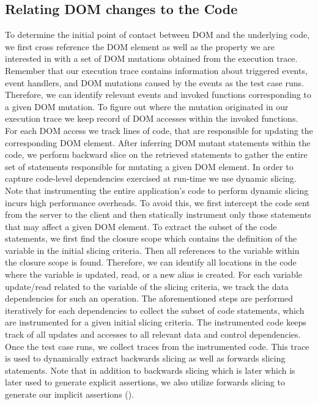 \subsection{Relating DOM changes to the \javascript Code} \label{Sec:domToCode}
To determine the initial point of contact between DOM and the underlying \javascript code, we first cross reference the DOM element as well as the property we are interested in with a set of DOM mutations obtained from the execution trace. Remember that our execution trace contains information about triggered events, event handlers, and DOM mutations caused by the events as the test case runs. Therefore, we can identify relevant events and invoked functions corresponding to a given DOM mutation. To figure out where the mutation originated in our execution trace we keep record of DOM accesses within the invoked functions. For each DOM access we track \javascript lines of code, that are responsible for updating the corresponding DOM element. After inferring DOM mutant statements within the code, we perform backward slice on the retrieved statements to gather the entire set of \javascript statements responsible for mutating a given DOM element. 
In order to capture code-level dependencies exercised at run-time we use dynamic slicing. 
Note that instrumenting the entire application's code to perform dynamic slicing incurs high performance overheads. To avoid this, we first intercept the code sent from the server to the client and then statically instrument only those statements that may affect a given DOM element.
To extract the subset of the code statements, we first find the \javascript closure scope which contains the definition of the variable in the initial slicing criteria. Then all references to the variable within the closure scope is found. Therefore, we can identify all locations in the code where the variable is updated, read, or a new alias is created. For each variable update/read related to the variable of the slicing criteria, we track the data dependencies for such an operation. The aforementioned steps are performed iteratively for each dependencies to collect the subset of code statements, which are instrumented for a given initial slicing criteria.
The instrumented code keeps track of all updates and accesses to all relevant data and control dependencies.   
Once the test case runs, we collect traces from the instrumented code. This trace is used to dynamically extract backwards slicing as well as forwards slicing statements. Note that in addition to backwards slicing which is later which is later used to generate explicit assertions, we also utilize forwards slicing to generate our implicit assertions ().  

